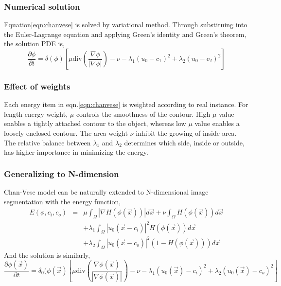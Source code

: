\subsubsection{Numerical solution}
Equation\ref{eqn:chanvese} is solved by variational method. Through substituing into the Euler-Lagrange equation and applying Green's identity and Green's theorem, the solution PDE is,
\begin{equation}
\frac{\partial \phi}{\partial t} = \delta(\phi)\left[\mu\mbox{div}\left(\frac{\nabla\phi}{|\nabla\phi|}\right)-\nu -\lambda_1(u_0-c_1)^2 + \lambda_2(u_0-c_2)^2\right]
\end{equation}

\subsubsection{Effect of weights}
Each energy item in eqn.\ref{eqn:chanvese} is weighted according to real instance. For length energy weight, $\mu$ controls the smoothness of the contour. High $\mu$ value enables a tightly attached contour to the object, whereas low $\mu$ value enables a loosely enclosed contour. The area weight $\nu$ inhibit the growing of inside area. The relative balance between $\lambda_1$ and $\lambda_2$ determines which side, inside or outside, has higher importance in minimizing the energy. 

\subsubsection{Generalizing to N-dimension}
Chan-Vese model can be naturally extended to N-dimensional image segmentation with the energy function,
\begin{eqnarray}
\nonumber
E(\phi, c_i, c_o) & = & \mu\int_\Omega |\nabla H(\phi(\vec{x}))|d\vec{x} + \nu\int_\Omega H(\phi(\vec{x}))d\vec{x}\\
                 &    & + \lambda_1\int_\Omega |u_0(\vec{x} - c_i)|^2H(\phi(\vec{x}))d\vec{x} \\
\nonumber
				 &    & + \lambda_2\int_\Omega |u_0(\vec{x} - c_o)|^2(1 - H(\phi(\vec{x})))d\vec{x}
\end{eqnarray}
And the solution is similarly,
\begin{equation}
\frac{\partial \phi(\vec{x})}{\partial t} = \delta_0(\phi(\vec{x})\left[\mu\mbox{div}\left(\frac{\nabla\phi(\vec{x})}{|\nabla\phi(\vec{x})|}\right)-\nu -\lambda_1(u_0(\vec{x})-c_i)^2 + \lambda_2(u_0(\vec{x})-c_o)^2\right] 
\end{equation}

